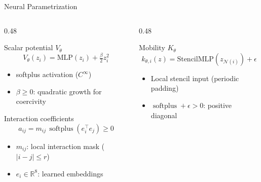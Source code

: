 \documentclass[aspectratio=169, 11pt]{beamer}
\newcommand{\R}{\mathbb{R}}
\newcommand{\softplus}{\operatorname{softplus}}
\begin{document}
\begin{frame}{Neural Parametrization}

\begin{columns}[T]
\begin{column}{0.48\textwidth}
\begin{block}{Scalar potential $V_\theta$}
\[
V_\theta(z_i) = \mathrm{MLP}(z_i) + \tfrac{\beta}{2} z_i^2
\]
\begin{itemize}
    \item softplus activation ($C^\infty$)
    \item $\beta \geq 0$: quadratic growth for coercivity
\end{itemize}
\end{block}

\begin{block}{Interaction coefficients}
\[
a_{ij} = m_{ij}\,\softplus(e_i^\top e_j) \geq 0
\]
\begin{itemize}
    \item $m_{ij}$: local interaction mask ($|i{-}j| \leq r$)
    \item $e_i \in \R^8$: learned embeddings
\end{itemize}
\end{block}
\end{column}

\begin{column}{0.48\textwidth}
\begin{block}{Mobility $K_\theta$}
\[
k_{\theta,i}(z) = \mathrm{StencilMLP}(z_{\mathcal{N}(i)}) + \epsilon
\]
\begin{itemize}
    \item Local stencil input (periodic padding)
    \item $\softplus + \epsilon > 0$: positive diagonal
\end{itemize}
\end{block}
\end{column}
\end{columns}
\end{frame}
\end{document}
